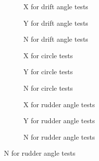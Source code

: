 \begin{figure}[H]
     \centering
     \begin{subfigure}[b]{0.3\textwidth}
         \centering
        
        \caption{X for drift angle tests}
        \label{fig:drift_angle_X_wPCC}
     \end{subfigure}
     \hfill
     \begin{subfigure}[b]{0.3\textwidth}
         \centering
         
        \caption{Y for drift angle tests}
        \label{fig:drift_angle_Y_wPCC}
     \end{subfigure}
     \hfill
     \begin{subfigure}[b]{0.3\textwidth}
         \centering
         
        \caption{N for drift angle tests}
        \label{fig:drift_angle_N_wPCC}
     \end{subfigure}
    \vfill
    
     \begin{subfigure}[b]{0.3\textwidth}
         \centering
         
        \caption{X for circle tests}
        \label{fig:circle_X_wPCC}
     \end{subfigure}
     \hfill
     \begin{subfigure}[b]{0.3\textwidth}
         \centering
         
        \caption{Y for circle tests}
        \label{fig:circle_Y_wPCC}
     \end{subfigure}
     \hfill
     \begin{subfigure}[b]{0.3\textwidth}
         \centering
         
        \caption{N for circle tests}
        \label{fig:circle_N_wPCC}
     \end{subfigure}

    \vfill
     \begin{subfigure}[b]{0.3\textwidth}
         \centering
         
        \caption{X for rudder angle tests}
        \label{fig:rudder_angle_X_wPCC}
     \end{subfigure}
     \hfill
     \begin{subfigure}[b]{0.3\textwidth}
         \centering
         
        \caption{Y for rudder angle tests}
        \label{fig:rudder_angle_Y_wPCC}
     \end{subfigure}
     \hfill
     \begin{subfigure}[b]{0.3\textwidth}
         \centering
         
        \caption{N for rudder angle tests}
        \label{fig:rudder_angle_N_wPCC}
     \end{subfigure}


\end{figure}
